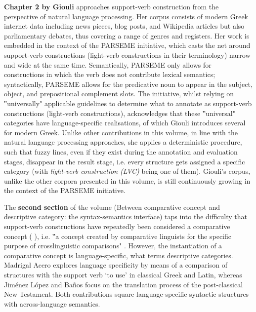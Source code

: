 \documentclass[output=paper,colorlinks,citecolor=brown]{langscibook}
\begin{document}
\textbf{Chapter 2 by Giouli} approaches support-verb construction from the perspective of natural language processing. Her corpus consists of modern Greek internet data including news pieces, blog posts, and Wikipedia articles but also parliamentary debates, thus covering a range of genres and registers. Her work is embedded in the context of the PARSEME initiative, which casts the net around support-verb constructions (light-verb constructions in their terminology) narrow and wide at the same time. Semantically, PARSEME only allows for constructions in which the verb does not contribute lexical semantics; syntactically, PARSEME allows for the predicative noun to appear in the subject, object, and prepositional complement slots. The initiative, whilst relying on ‟universally" applicable guidelines to determine what to annotate as support-verb constructions (light-verb constructions), acknowledges that these ‟universal" categories have language-specific realisations, of which Giouli introduces several for modern Greek. Unlike other contributions in this volume, in line with the natural language processing approaches, she applies a deterministic procedure, such that fuzzy lines, even if they exist during the annotation and evaluation stages, disappear in the result stage, i.e. every structure gets assigned a specific category (with \textit{light-verb construction (LVC)} being one of them). Giouli’s corpus, unlike the other corpora presented in this volume, is still continuously growing in the context of the PARSEME initiative. 


The \textbf{second section} of the volume (Between comparative concept and descriptive category: the syntax-semantics interface) taps into the difficulty that support-verb constructions have repeatedly been considered a comparative concept (\citealt[96]{savaryPARSEMEMultilingualCorpus2018} \citealt[29–31]{hoffmannLatinSupportverbConstructions2023}), i.e. ‟a concept created by comparative linguists for the specific purpose of crosslinguistic comparisons" \citep[665]{haspelmathComparativeConceptsDescriptive2010}. However, the instantiation of a comparative concept is language-specific, what \citet[664]{haspelmathComparativeConceptsDescriptive2010} terms descriptive categories. Madrigal Acero explores language specificity by means of a comparison of structures with the support verb ‘to use’ in classical Greek and Latin, whereas Jiménez López and Baños focus on the translation process of the post-classical New Testament. Both contributions square language-specific syntactic structures with across-language semantics. 
\end{document}
